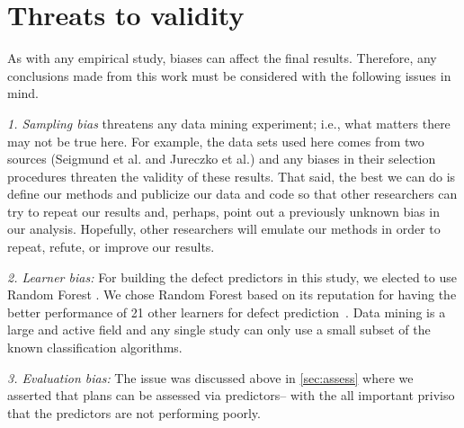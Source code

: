 \documentclass[conference]{IEEEtran}
\newcommand{\tion}[1]{\textsection\ref{sec:#1}}
\begin{document}
\section{Threats to validity}

 

As with any empirical study, biases can affect the final results. Therefore, any
conclusions made from this work must be considered with the following issues in
mind.

{\em 1. Sampling bias} threatens any data mining experiment; i.e., what matters
there may not be true here. For example, the data sets used here comes from two sources
(Seigmund et al. and Jureczko et al.) and any biases in their selection procedures
threaten the validity of these results. 
That said,
the best we can do is define our methods and publicize our data and code so that other researchers can
try to repeat our results and, perhaps, point out a previously unknown bias
in our analysis. Hopefully, other researchers will emulate our methods in
order to repeat, refute, or improve our results. 

{\em 2. Learner bias: } For building the defect predictors in this study, we elected
to use  Random Forest  .
We chose Random Forest based on its reputation for having the better  performance of 
21 other learners for defect prediction~\cite{lessmann}.
Data mining is a
large and active field and any single study can only use a small
subset of the known classification algorithms.  

{\em 3. Evaluation bias:} The issue was discussed above in \tion{assess} where
we asserted that plans can be assessed via predictors-- with the all important
priviso that the predictors are not performing poorly.
 
 

\end{document}
